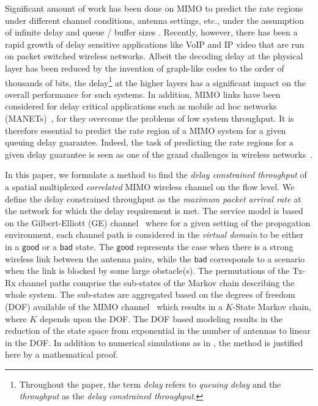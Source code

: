 \documentclass[10pt,conference]{IEEEtran}
\begin{document}
Significant amount of work has been done on MIMO to predict the rate regions under different channel conditions, antenna settings, etc.,
under the assumption of infinite delay and queue / buffer sizes \cite{MIMO:Teletar99:CapacityOfMultiAntennaGaus}.
Recently, however, there has been a rapid growth of delay sensitive applications like VoIP and IP video that are  run on packet switched wireless networks.
Albeit the decoding delay at the physical layer has been reduced by the invention of graph-like codes to the order of thousands of bits, the delay\footnote{Throughout the paper, the term \emph{delay} refers to \emph{queuing delay} and the \emph{throughput} as the \emph{delay constrained throughput}.}
at the higher layers has a significant impact on the overall performance for such systems.
In addition, MIMO links have been considered for delay critical applications such as mobile ad hoc networks (MANETs)~\cite{MIMO:Adhoc:Chen06}, for they overcome the problems of low system throughput.
It is therefore essential to predict the rate region of a MIMO system for a given queuing delay guarantee.
Indeed, the task of predicting the rate regions for a given delay guarantee is seen as one of the grand challenges in wireless networks~\cite{NIT:Jan08:RethinkingIT}.

In this paper, we formulate a method to find the \emph{delay constrained throughput} of a spatial multiplexed \emph{correlated} MIMO wireless channel on the flow level.
We define the delay constrained throughput as the \emph{maximum packet arrival rate} at the network for which the delay requirement is met.
The service model is based on the Gilbert-Elliott (GE) channel~\cite{WirelessMarkov:Gilbert60:CapacityBurstNoiseChannel, elliot_noise} where for a given setting of the propagation environment, each channel path is considered in the \emph{virtual domain}  \cite{MIMO:Correlated:Sayeed02:Deconstructing,MIMO:Veeravalli2005:CorrelatedMIMO:Variance}  to be either in a $\mathsf{good}$ or a $\mathsf{bad}$ state.
The $\mathsf{good}$ represents the case when there is a strong wireless link between the antenna pairs, while the $\mathsf{bad}$ corresponds to a scenario when the link is blocked by some large obstacle(s).
The permutations of the Tx-Rx channel paths comprise the sub-states of the Markov chain describing the whole system.
The sub-states are aggregated based on the degrees of freedom (DOF) available of the MIMO channel~\cite{MIMO:QoS:FSM:Kashif} which results in a $K$-State Markov chain, where $K$ depends upon the DOF.
The DOF based modeling results in the reduction of the state space from exponential in the number of antennas to linear in the DOF.
In addition to numerical simulations as in \cite{MIMO:QoS:FSM:Kashif}, the method is justified here by a mathematical proof.
\end{document}
